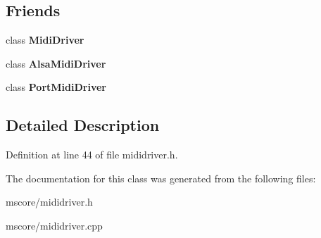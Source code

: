 \subsection*{Friends}
\begin{DoxyCompactItemize}
\item 
\mbox{\label{class_ms_1_1_port_a10f153164613f42fab4101b611fa9f5e}} 
class {\bfseries Midi\+Driver}
\item 
\mbox{\label{class_ms_1_1_port_a8ae809997abe215fb4dfd82b72eab658}} 
class {\bfseries Alsa\+Midi\+Driver}
\item 
\mbox{\label{class_ms_1_1_port_a2a0375e60d478d6be099ef93f7b60ed4}} 
class {\bfseries Port\+Midi\+Driver}
\end{DoxyCompactItemize}


\subsection{Detailed Description}


Definition at line 44 of file mididriver.\+h.



The documentation for this class was generated from the following files\+:\begin{DoxyCompactItemize}
\item 
mscore/mididriver.\+h\item 
mscore/mididriver.\+cpp\end{DoxyCompactItemize}
